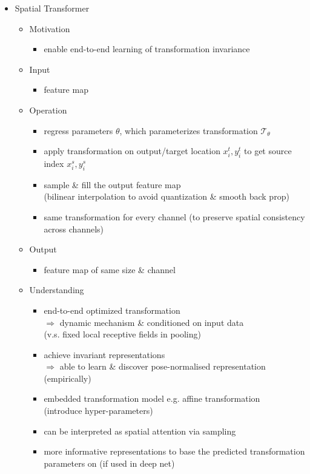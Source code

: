 \begin{itemize}
\item Spatial Transformer
	\begin{itemize}
	\item Motivation
		\begin{itemize}
		\item enable end-to-end learning of transformation invariance
		\end{itemize}
	\item Input
		\begin{itemize}
		\item feature map
		\end{itemize}
	\item Operation
		\begin{itemize}
		\item regress parameters $\theta$, which parameterizes transformation $\mathcal T_\theta$
		\item apply transformation on output/target location $x_i^t,y_i^t$ to get source index $x_i^s, y_i^s$
		\item sample \& fill the output feature map \\
		(bilinear interpolation to avoid quantization \& smooth back prop)
		\item same transformation for every channel (to preserve spatial consistency across channels)
		\end{itemize}
	\item Output
		\begin{itemize}
		\item feature map of same size \& channel
		\end{itemize}
	\item Understanding
		\begin{itemize}
		\item end-to-end optimized transformation \\
		$\Rightarrow$ dynamic mechanism \& conditioned on input data \\
		(v.s. fixed local receptive fields in pooling)
		\item achieve invariant representations \\ 
		$\Rightarrow$ able to learn \& discover pose-normalised representation (empirically) 
		\item embedded transformation model e.g. affine transformation \\
		(introduce hyper-parameters)
		\item can be interpreted as spatial attention via sampling
		\item more informative representations to base the predicted transformation parameters on (if used in deep net)
		\end{itemize}
	\end{itemize}


\end{itemize}
